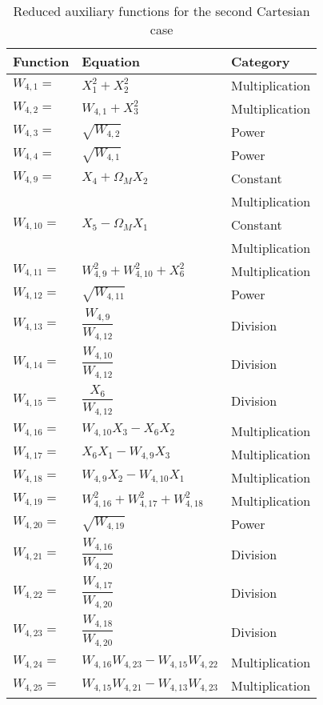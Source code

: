{\small
\begin{longtable}{|p{1.5cm}|l|p{2cm}|}
\caption{Reduced auxiliary functions for the second Cartesian case}
\label{tab:auxFunc2}
\endfirsthead
\endhead
\hline
\textbf{Function} & \textbf{Equation} & \textbf{Category}  \\ \hline \hline
\hline 
$W_{4,1}=$ & $ X_{1}^{2}+X_{2}^{2} $ & Multiplication \\ \hline
$W_{4,2}=$ & $ W_{4,1}+X_{3}^{2} $ & Multiplication \\ \hline
$W_{4,3}=$ & $ \sqrt{W_{4,2}} $ & Power \\ \hline
$W_{4,4}=$ & $ \sqrt{W_{4,1}} $ & Power \\ \hline
$W_{4,9}=$ & $ X_{4}+\Omega_{M}X_{2} $ & Constant  \\ 
& & Multiplication \\ \hline
$W_{4,10}=$ & $ X_{5}-\Omega_{M}X_{1} $ & Constant  \\ 
& & Multiplication \\ \hline
$W_{4,11}=$ & $ W_{4,9}^{2}+W_{4,10}^{2}+X_{6}^{2} $ & Multiplication \\ \hline
$W_{4,12}=$ & $ \sqrt{W_{4,11}} $ & Power \\ \hline
$W_{4,13}=$ & $ \dfrac{W_{4,9}}{W_{4,12}} $ & Division \\ \hline
$W_{4,14}=$ & $ \dfrac{W_{4,10}}{W_{4,12}} $ & Division \\ \hline
$W_{4,15}=$ & $ \dfrac{X_{6}}{W_{4,12}} $ & Division \\ \hline
$W_{4,16}=$ & $ W_{4,10}X_{3}-X_{6}X_{2} $ & Multiplication \\ \hline
$W_{4,17}=$ & $ X_{6}X_{1}-W_{4,9}X_{3} $ & Multiplication \\ \hline
$W_{4,18}=$ & $ W_{4,9}X_{2}-W_{4,10}X_{1} $ & Multiplication \\ \hline
$W_{4,19}=$ & $ W_{4,16}^{2}+W_{4,17}^{2}+W_{4,18}^{2} $ & Multiplication \\ \hline
$W_{4,20}=$ & $ \sqrt{W_{4,19}} $ & Power \\ \hline
$W_{4,21}=$ & $ \dfrac{W_{4,16}}{W_{4,20}} $ & Division \\ \hline
$W_{4,22}=$ & $ \dfrac{W_{4,17}}{W_{4,20}} $ & Division \\ \hline
$W_{4,23}=$ & $ \dfrac{W_{4,18}}{W_{4,20}} $ & Division \\ \hline
$W_{4,24}=$ & $ W_{4,16}W_{4,23}-W_{4,15}W_{4,22} $ & Multiplication \\ \hline
$W_{4,25}=$ & $ W_{4,15}W_{4,21}-W_{4,13}W_{4,23} $ & Multiplication \\ \hline

\end{longtable}}
